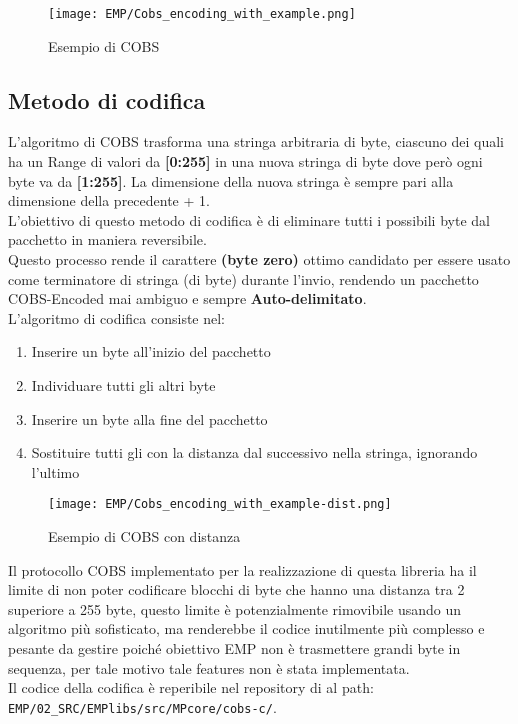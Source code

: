 \begin{figure}[H]
	\centering
	\caption[Esempio di COBS]{Esempio di COBS}
	\texttt{[image: EMP/Cobs\_encoding\_with\_example.png]}
\end{figure}

\subsection{Metodo di codifica}
L'algoritmo di COBS trasforma una stringa arbitraria di byte, ciascuno dei quali ha un Range di valori da \textbf{[0:255]} in una nuova stringa di byte dove però ogni byte va da \textbf{[{\color{red}1}:255]}. La dimensione della nuova stringa è sempre pari alla dimensione della precedente + 1.\\
L'obiettivo di questo metodo di codifica è di eliminare tutti i possibili byte \zeroByte dal pacchetto in maniera reversibile.\\
Questo processo rende il carattere \textbf{\zeroByte (byte zero)} ottimo candidato per essere usato come terminatore di stringa (di byte) durante l'invio, rendendo un pacchetto COBS-Encoded mai ambiguo e sempre \textbf{Auto-delimitato}.\\
L'algoritmo di codifica consiste nel:\vspace{-5mm}
\begin{enumerate} [itemsep=-3mm]
	\item Inserire un byte \zeroByte all'inizio del pacchetto
	\item Individuare tutti gli altri byte \zeroByte
	\item Inserire un byte \zeroByte alla fine del pacchetto
	\item Sostituire tutti gli \zeroByte con la distanza dal successivo \zeroByte nella stringa, ignorando l'ultimo
\end{enumerate}\vspace{-8mm}

\begin{figure}[H]
	\centering
	\caption[Esempio di COBS con distanza]{Esempio di COBS con distanza}
	\vspace{1mm}
	\texttt{[image: EMP/Cobs\_encoding\_with\_example-dist.png]}
\end{figure}
\noindent
Il protocollo COBS implementato per la realizzazione di questa libreria ha il limite di non poter codificare blocchi di byte che hanno una distanza tra 2 \zeroByte superiore a 255 byte, questo limite è potenzialmente rimovibile usando un algoritmo più sofisticato, ma renderebbe il codice inutilmente più complesso e pesante da gestire poiché obiettivo EMP non è trasmettere grandi byte in sequenza, per tale motivo tale features non è stata implementata.\\
Il codice della codifica è reperibile nel repository di \cite*{EMP} al path:\\ \verb*|EMP/02_SRC/EMPlibs/src/MPcore/cobs-c/|.

